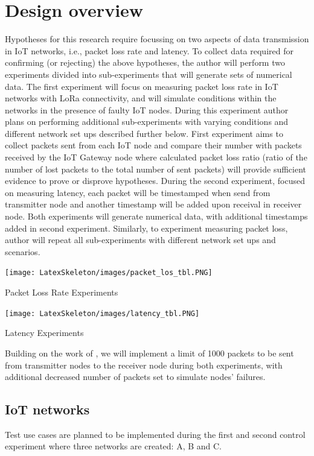 \documentclass[oneside,12pt]{book}
\begin{document}
\section{Design overview}
Hypotheses for this research require focussing on two aspects of data transmission in IoT networks, i.e., packet loss rate and latency. To collect data required for confirming (or rejecting) the above hypotheses, the author will perform two experiments divided into sub-experiments that will generate sets of numerical data.\smallskip \newline
The first experiment will focus on measuring packet loss rate in IoT networks with LoRa connectivity, and will simulate conditions within the networks in the presence of faulty IoT nodes. During this experiment author plans on performing additional sub-experiments with varying conditions and different network set ups described further below. First experiment aims to collect packets sent from each IoT node and compare their number with packets received by the IoT Gateway node where calculated packet loss ratio (ratio of the number of lost packets to the total number of sent packets) will provide sufficient evidence to prove or disprove hypotheses.\smallskip \newline
During the second experiment, focused on measuring latency, each packet will be timestamped when send from transmitter node and another timestamp will be added upon receival in receiver node. Both experiments will generate  numerical data, with additional timestamps added in second experiment. Similarly, to experiment measuring packet loss, author will repeat all sub-experiments with different network set ups and scenarios.\smallskip \newline
\begin{table}[H]
  \centering
  \label{tbl:Packet Loss Rate Experiments}
  \texttt{[image: LatexSkeleton/images/packet\_los\_tbl.PNG]}
  \caption{Packet Loss Rate Experiments}
\end{table}

\begin{table}[H]
  \centering
  \label{tbl:Latency Experiments}
  \texttt{[image: LatexSkeleton/images/latency\_tbl.PNG]}
  \caption{Latency Experiments}
\end{table}
\noindent Building on the work of \cite{Kuipers}, we will implement a limit of 1000 packets to be sent from transmitter nodes to the receiver node during both experiments, with additional decreased number of packets set to simulate nodes’ failures.
\subsection{IoT networks}
Test use cases are planned to be implemented during the first and second control experiment where three networks are created: A, B and C. 
\end{document}
